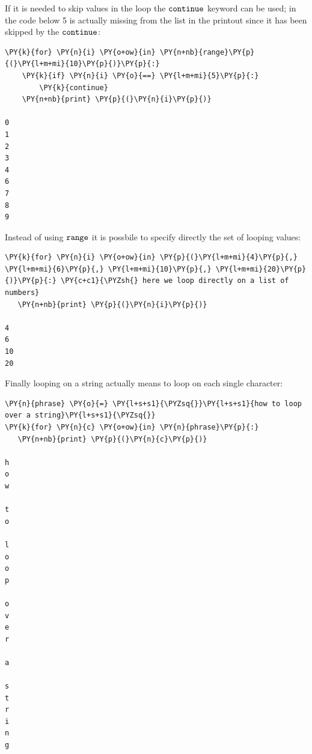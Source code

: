 If it is needed to skip values in the loop the $\tt{continue}$ keyword can be used; in the code below 5 is actually missing from the list in the printout since it has been skipped by the $\tt{continue}$:

\begin{tcolorbox}[breakable, size=fbox, boxrule=1pt, pad at break*=1mm, colback=cellbackground, colframe=cellborder]            
\begin{Verbatim}[commandchars=\\\{\}]
\PY{k}{for} \PY{n}{i} \PY{o+ow}{in} \PY{n+nb}{range}\PY{p}{(}\PY{l+m+mi}{10}\PY{p}{)}\PY{p}{:}
    \PY{k}{if} \PY{n}{i} \PY{o}{==} \PY{l+m+mi}{5}\PY{p}{:}
        \PY{k}{continue} 
    \PY{n+nb}{print} \PY{p}{(}\PY{n}{i}\PY{p}{)}

0
1
2
3
4
6
7
8
9
\end{Verbatim}
\end{tcolorbox}

Instead of using $\tt{range}$ it is possbile to specify directly the set of looping values:

\begin{tcolorbox}[breakable, size=fbox, boxrule=1pt, pad at break*=1mm, colback=cellbackground, colframe=cellborder]            

\begin{Verbatim}[commandchars=\\\{\}]
\PY{k}{for} \PY{n}{i} \PY{o+ow}{in} \PY{p}{(}\PY{l+m+mi}{4}\PY{p}{,} \PY{l+m+mi}{6}\PY{p}{,} \PY{l+m+mi}{10}\PY{p}{,} \PY{l+m+mi}{20}\PY{p}{)}\PY{p}{:} \PY{c+c1}{\PYZsh{} here we loop directly on a list of numbers}
   \PY{n+nb}{print} \PY{p}{(}\PY{n}{i}\PY{p}{)}

4
6
10
20
\end{Verbatim}
\end{tcolorbox}

Finally looping on a string actually means to loop on each single character:
 
\begin{tcolorbox}[breakable, size=fbox, boxrule=1pt, pad at break*=1mm, colback=cellbackground, colframe=cellborder]            
\begin{Verbatim}[commandchars=\\\{\}]
\PY{n}{phrase} \PY{o}{=} \PY{l+s+s1}{\PYZsq{}}\PY{l+s+s1}{how to loop over a string}\PY{l+s+s1}{\PYZsq{}}
\PY{k}{for} \PY{n}{c} \PY{o+ow}{in} \PY{n}{phrase}\PY{p}{:}
   \PY{n+nb}{print} \PY{p}{(}\PY{n}{c}\PY{p}{)}

h
o
w
 
t
o
 
l
o
o
p
 
o
v
e
r
 
a
 
s
t
r
i
n
g
\end{Verbatim}
\end{tcolorbox}

